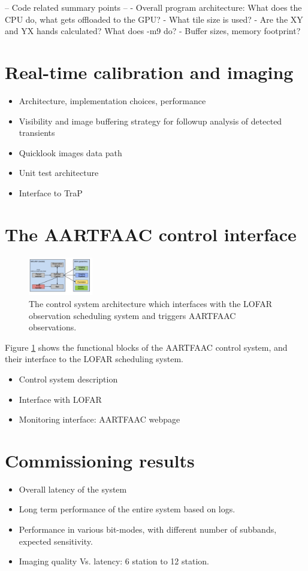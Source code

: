 \documentclass{aa}
\begin{document}
-- Code related summary points --
- Overall program architecture: What does the CPU do, what gets offloaded to the GPU?
- What tile size is used?
- Are the XY and YX hands calculated? What does -m9 do?
- Buffer sizes, memory footprint?


\section {\label{sec:calim} Real-time calibration and imaging}
\begin {itemize}
 \item {Architecture, implementation choices, performance}
 \item  {Visibility  and  image  buffering strategy  for  followup  analysis  of
   detected transients}
 \item {Quicklook images data path}
 \item {Unit test architecture}
 \item {Interface to TraP}
\end {itemize}

\section {\label{sec:acontrol} The AARTFAAC control interface}
\begin{figure}[htbp]
\centering
\includegraphics[width=0.25\textwidth]{Figs/control_sys.png}
\caption{The  control  system  architecture  which  interfaces  with  the  LOFAR
  observation scheduling system and triggers AARTFAAC observations.}
\label{fig:afaac_ctrl_sys}
\end{figure}
Figure  \ref{fig:afaac_ctrl_sys} shows  the  functional blocks  of the  AARTFAAC
control system, and their interface to the LOFAR scheduling system.
\begin {itemize}
 \item {Control system description}
 \item {Interface with LOFAR}
 \item {Monitoring interface: AARTFAAC webpage}
\end {itemize}

\section {\label{sec:results} Commissioning results}
\begin {itemize}
 \item {Overall latency of the system}
 \item {Long term performance of the entire system based on logs.}
 \item {Performance  in various  bit-modes, with  different number  of subbands,
   expected sensitivity.}
 \item {Imaging quality Vs. latency: 6 station to 12 station.}
\end {itemize}
\end{document}
